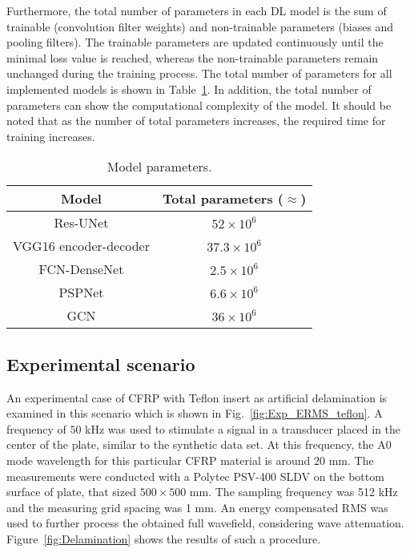 Furthermore, the total number of parameters in each DL model is the sum of trainable (convolution filter weights) and non-trainable parameters (biases and pooling filters).
The trainable parameters are updated continuously until the minimal loss value is reached, whereas the non-trainable parameters remain unchanged during the training process.
The total number of parameters for all implemented models is shown in Table~\ref{tab:table_parameters}.
In addition, the total number of parameters can show the computational complexity of the model.
It should be noted that as the number of total parameters increases, the required time for training increases.
\begin{table}[]
	\centering
	\caption{Model parameters.}
	\label{tab:table_parameters}
	\begin{tabular}{cc}\hline
		Model & Total parameters (\(\approx\)) \\ \hline
		Res-UNet & \(52\times 10^6\) \\ 
		VGG16 encoder-decoder & \(37.3\times 10^6\) \\
		FCN-DenseNet & \(2.5\times 10^6\) \\ 
		PSPNet & \(6.6\times 10^6\) \\ 
		GCN & \(36\times 10^6\) \\ \hline
	\end{tabular}
\end{table}
\subsection{Experimental scenario}
An experimental case of CFRP with Teflon insert as artificial delamination is examined in this scenario which is shown in Fig.~\ref{fig:Exp_ERMS_teflon}.
A frequency of \(50\) kHz was used to stimulate a signal in a transducer placed in the center of the plate, similar to the synthetic data set.
At this frequency, the A0 mode wavelength for this particular CFRP material is around \(20\) mm.
The measurements were conducted with a Polytec PSV-400 SLDV on the bottom surface of plate, that sized \(500 \times 500\) mm.
The sampling frequency was 512 kHz and the measuring grid spacing was 1 mm.
An energy compensated RMS was used to further process the obtained full wavefield, considering wave attenuation.
Figure~\ref{fig:Delamination} shows the results of such a procedure.

